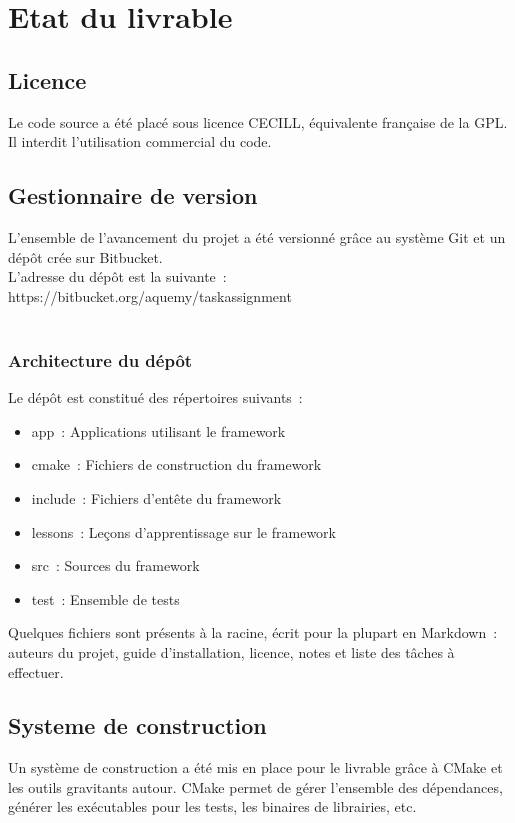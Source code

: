 \section{Etat du livrable}
\subsection{Licence}
Le code source a été placé sous licence CECILL, équivalente française de la GPL. Il interdit l'utilisation commercial du code.
\subsection{Gestionnaire de version}
L'ensemble de l'avancement du projet a été versionné grâce au système Git et un dépôt crée sur Bitbucket.\\

L'adresse du dépôt est la suivante~: https://bitbucket.org/aquemy/taskassignment\\\\

\subsubsection{Architecture du dépôt}
Le dépôt est constitué des répertoires suivants~:
\begin{itemize}
\item app~: Applications utilisant le framework
\item cmake~: Fichiers de construction du framework
\item include~: Fichiers d'entête du framework
\item lessons~: Leçons d'apprentissage sur le framework
\item src~: Sources du framework
\item test~: Ensemble de tests\\
\end{itemize}

Quelques fichiers sont présents à la racine, écrit pour la plupart en Markdown~: auteurs du projet, guide d'installation, licence, notes et liste des tâches à effectuer.

\subsection{Systeme de construction}
Un système de construction a été mis en place pour le livrable grâce à CMake et les outils gravitants autour.
CMake permet de gérer l'ensemble des dépendances, générer les exécutables pour les tests, les binaires de librairies, etc.\\\\

